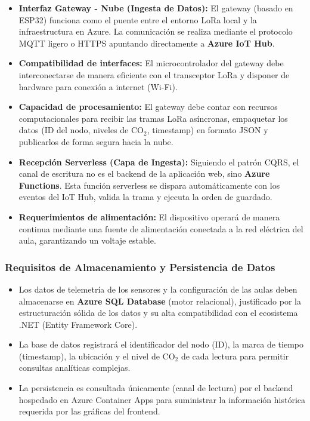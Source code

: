\begin{itemize}
    \item \textbf{Interfaz Gateway - Nube (Ingesta de Datos):} El gateway (basado en ESP32) funciona como el puente entre el entorno LoRa local y la infraestructura en Azure. La comunicación se realiza mediante el protocolo MQTT ligero o HTTPS apuntando directamente a \textbf{Azure IoT Hub}.
    \item \textbf{Compatibilidad de interfaces:} El microcontrolador del gateway debe interconectarse de manera eficiente con el transceptor LoRa y disponer de hardware para conexión a internet (Wi-Fi).
    \item \textbf{Capacidad de procesamiento:} El gateway debe contar con recursos computacionales para recibir las tramas LoRa asíncronas, empaquetar los datos (ID del nodo, niveles de CO\(_2\), timestamp) en formato JSON y publicarlos de forma segura hacia la nube.
    \item \textbf{Recepción Serverless (Capa de Ingesta):} Siguiendo el patrón CQRS, el canal de escritura no es el backend de la aplicación web, sino \textbf{Azure Functions}. Esta función serverless se dispara automáticamente con los eventos del IoT Hub, valida la trama y ejecuta la orden de guardado.
    \item \textbf{Requerimientos de alimentación:} El dispositivo operará de manera continua mediante una fuente de alimentación conectada a la red eléctrica del aula, garantizando un voltaje estable.
\end{itemize}

\subsubsection{Requisitos de Almacenamiento y Persistencia de Datos}

\begin{itemize}
    \item Los datos de telemetría de los sensores y la configuración de las aulas deben almacenarse en \textbf{Azure SQL Database} (motor relacional), justificado por la estructuración sólida de los datos y su alta compatibilidad con el ecosistema .NET (Entity Framework Core).
    \item La base de datos registrará el identificador del nodo (ID), la marca de tiempo (timestamp), la ubicación y el nivel de CO\(_2\) de cada lectura para permitir consultas analíticas complejas.
    \item La persistencia es consultada únicamente (canal de lectura) por el backend hospedado en Azure Container Apps para suministrar la información histórica requerida por las gráficas del frontend.
\end{itemize}









